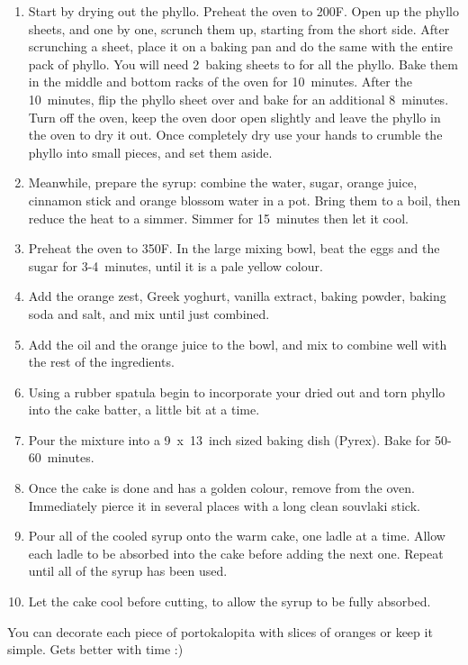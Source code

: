 \begin{enumerate}
    \item Start by drying out the phyllo. Preheat the oven to 200\degree F. Open up the phyllo sheets, and one by one, scrunch them up, starting from the short side. After scrunching a sheet, place it on a baking pan and do the same with the entire pack of phyllo. You will need 2~baking sheets to for all the phyllo. Bake them in the middle and bottom racks of the oven for 10~minutes. After the 10~minutes, flip the phyllo sheet over and bake for an additional 8~minutes. Turn off the oven, keep the oven door open slightly and leave the phyllo in the oven to dry it out. Once completely dry use your hands to crumble the phyllo into small pieces, and set them aside.
    \item Meanwhile, prepare the syrup: combine the water, sugar, orange juice, cinnamon stick and orange blossom water in a pot. Bring them to a boil, then reduce the heat to a simmer. Simmer for 15~minutes then let it cool.
    \item Preheat the oven to 350\degree F. In the large mixing bowl, beat the eggs and the sugar for 3-4~minutes, until it is a pale yellow colour.
    \item Add the orange zest, Greek yoghurt, vanilla extract, baking powder, baking soda and salt, and mix until just combined.
    \item Add the oil and the orange juice to the bowl, and mix to combine well with the rest of the ingredients.
    \item Using a rubber spatula begin to incorporate your dried out and torn phyllo into the cake batter, a little bit at a time.
    \item Pour the mixture into a 9~x~13~inch sized baking dish (Pyrex). Bake for 50-60~minutes.
    \item Once the cake is done and has a golden colour, remove from the oven. Immediately pierce it in several places with a long clean souvlaki stick.
    \item Pour all of the cooled syrup onto the warm cake, one ladle at a time. Allow each ladle to be absorbed into the cake before adding the next one. Repeat until all of the syrup has been used.
    \item Let the cake cool before cutting, to allow the syrup to be fully absorbed.
\end{enumerate}

You can decorate each piece of portokalopita with slices of oranges or keep it simple. Gets better with time :)


